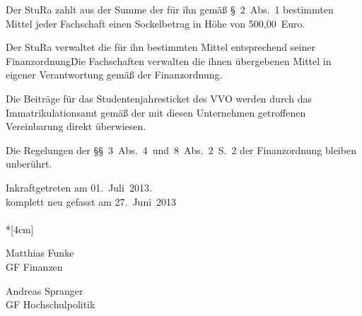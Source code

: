 \begin{multicols}{2}
\Abs \Satz  Der StuRa zahlt aus der Summe der für ihn gemäß §~2~Abs.~1 bestimmten Mittel jeder Fachschaft einen Sockelbetrag in Höhe von 500,00~Euro.

\Abs \Satz  Der StuRa verwaltet die für ihn bestimmten Mittel entsprechend seiner Finanzordnung\. Die Fachschaften verwalten die ihnen übergebenen Mittel in eigener Verantwortung gemäß der Finanzordnung.

\Abs \Satz  Die Beiträge für das Studentenjahresticket des VVO werden durch das Immatrikulationsamt gemäß der mit diesen Unternehmen getroffenen Vereinbarung direkt überwiesen.

\Abs \Satz  Die Regelungen der §§~3~Abs.~4~und~8~Abs.~2~S.~2 der Finanzordnung bleiben unberührt.

\end{multicols}

\nopagebreak
\vspace{1cm}
Inkraftgetreten am 01.~Juli~2013.
\\


\footnotesize
komplett neu gefasst am 27.~Juni~2013\\

\normalsize
~\\*[4cm]
\begin{center}
\hspace*{\fill}
\parbox{7cm}{Matthias Funke\\GF Finanzen}
\hfill\parbox{7cm}{Andreas Spranger\\GF Hochschulpolitik}
\hspace*{\fill}
\end{center}


